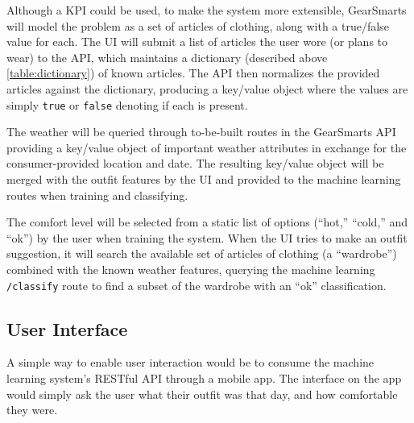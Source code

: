 Although a KPI could be used, to make the system more extensible, GearSmarts will model the problem as a set of
articles of clothing, along with a true/false value for each. The UI will submit a list of articles the user wore (or
plans to wear) to the API, which maintains a dictionary (described above \ref{table:dictionary}) of known articles. The
API then normalizes the provided articles against the dictionary, producing a key/value object where the values are
simply \texttt{true} or \texttt{false} denoting if each is present.

The weather will be queried through to-be-built routes in the GearSmarts API providing a key/value object of important
weather attributes in exchange for the consumer-provided location and date. The resulting key/value object will be
merged with the outfit features by the UI and provided to the machine learning routes when training and classifying.

The comfort level will be selected from a static list of options (``hot,'' ``cold,'' and ``ok'') by the user when
training the system. When the UI tries to make an outfit suggestion, it will search the available set of articles of
clothing (a ``wardrobe'') combined with the known weather features, querying the machine learning \texttt{/classify}
route to find a subset of the wardrobe with an ``ok'' classification.


\subsection{User Interface}
A simple way to enable user interaction would be to consume the machine learning system's RESTful API through a
mobile app. The interface on the app would simply ask the user what their outfit was that day, and how comfortable
they were.
